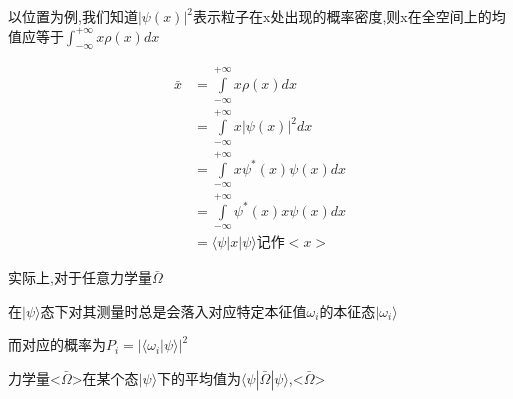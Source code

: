 \documentclass[lang=cn,15pt]{elegantbook}
\begin{document}
 以位置为例,我们知道$|\psi(x)|^2$表示粒子在x处出现的概率密度,则x在全空间上的均值应等于$\int_{-\infty}^{+\infty}x\rho(x)dx$
 
 \begin{equation*}
 	\begin{split}
 		\bar{x}&=\int\limits_{-\infty}^{+\infty}{x\rho \left( x \right) dx}
 		\\
 		&=\int\limits_{-\infty}^{+\infty}{x|\psi \left( x \right) |^2dx}
 		\\
 		&=\int\limits_{-\infty}^{+\infty}{x\psi ^*\left( x \right) \psi \left( x \right) dx}
 		\\
 		&=\int\limits_{-\infty}^{+\infty}{\psi ^*\left( x \right) x\psi \left( x \right) dx}
 		\\
 		&=\langle \psi |x|\psi \rangle \text{记作}<x>
 	\end{split}
 \end{equation*}
 
 实际上,对于任意力学量$\bar{\Omega}$
 
 在$|\psi\rangle$态下对其测量时总是会落入对应特定本征值$\omega_i$的本征态$|\omega_i\rangle$
 
 而对应的概率为$P_i =|\langle\omega_i|\psi\rangle|^2$
 
 力学量<$\bar{\Omega}$>在某个态$|\psi\rangle$下的平均值为$\langle\psi|\bar{\Omega}|\psi\rangle$,<$\bar{\Omega}$>
 
\end{document}
